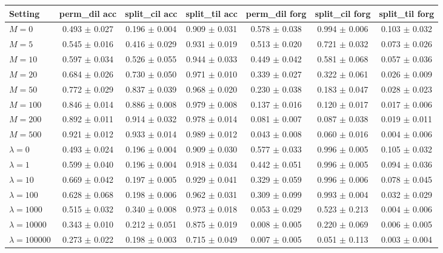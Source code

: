 \begin{tabular}{lcccccc}
\toprule
Setting & perm\_dil acc & split\_cil acc & split\_til acc & perm\_dil forg & split\_cil forg & split\_til forg \\
\midrule
$M=0$ & 0.493 $\pm$ 0.027 & 0.196 $\pm$ 0.004 & 0.909 $\pm$ 0.031 & 0.578 $\pm$ 0.038 & 0.994 $\pm$ 0.006 & 0.103 $\pm$ 0.032 \\
$M=5$ & 0.545 $\pm$ 0.016 & 0.416 $\pm$ 0.029 & 0.931 $\pm$ 0.019 & 0.513 $\pm$ 0.020 & 0.721 $\pm$ 0.032 & 0.073 $\pm$ 0.026 \\
$M=10$ & 0.597 $\pm$ 0.034 & 0.526 $\pm$ 0.055 & 0.944 $\pm$ 0.033 & 0.449 $\pm$ 0.042 & 0.581 $\pm$ 0.068 & 0.057 $\pm$ 0.036 \\
$M=20$ & 0.684 $\pm$ 0.026 & 0.730 $\pm$ 0.050 & 0.971 $\pm$ 0.010 & 0.339 $\pm$ 0.027 & 0.322 $\pm$ 0.061 & 0.026 $\pm$ 0.009 \\
$M=50$ & 0.772 $\pm$ 0.029 & 0.837 $\pm$ 0.039 & 0.968 $\pm$ 0.020 & 0.230 $\pm$ 0.038 & 0.183 $\pm$ 0.047 & 0.028 $\pm$ 0.023 \\
$M=100$ & 0.846 $\pm$ 0.014 & 0.886 $\pm$ 0.008 & 0.979 $\pm$ 0.008 & 0.137 $\pm$ 0.016 & 0.120 $\pm$ 0.017 & 0.017 $\pm$ 0.006 \\
$M=200$ & 0.892 $\pm$ 0.011 & 0.914 $\pm$ 0.032 & 0.978 $\pm$ 0.014 & 0.081 $\pm$ 0.007 & 0.087 $\pm$ 0.038 & 0.019 $\pm$ 0.011 \\
$M=500$ & 0.921 $\pm$ 0.012 & 0.933 $\pm$ 0.014 & 0.989 $\pm$ 0.012 & 0.043 $\pm$ 0.008 & 0.060 $\pm$ 0.016 & 0.004 $\pm$ 0.006 \\
\midrule
$\lambda=0$ & 0.493 $\pm$ 0.024 & 0.196 $\pm$ 0.004 & 0.909 $\pm$ 0.030 & 0.577 $\pm$ 0.033 & 0.996 $\pm$ 0.005 & 0.105 $\pm$ 0.032 \\
$\lambda=1$ & 0.599 $\pm$ 0.040 & 0.196 $\pm$ 0.004 & 0.918 $\pm$ 0.034 & 0.442 $\pm$ 0.051 & 0.996 $\pm$ 0.005 & 0.094 $\pm$ 0.036 \\
$\lambda=10$ & 0.669 $\pm$ 0.042 & 0.197 $\pm$ 0.005 & 0.929 $\pm$ 0.041 & 0.329 $\pm$ 0.059 & 0.996 $\pm$ 0.006 & 0.078 $\pm$ 0.045 \\
$\lambda=100$ & 0.628 $\pm$ 0.068 & 0.198 $\pm$ 0.006 & 0.962 $\pm$ 0.031 & 0.309 $\pm$ 0.099 & 0.993 $\pm$ 0.004 & 0.032 $\pm$ 0.029 \\
$\lambda=1000$ & 0.515 $\pm$ 0.032 & 0.340 $\pm$ 0.008 & 0.973 $\pm$ 0.018 & 0.053 $\pm$ 0.029 & 0.523 $\pm$ 0.213 & 0.004 $\pm$ 0.006 \\
$\lambda=10000$ & 0.343 $\pm$ 0.010 & 0.212 $\pm$ 0.051 & 0.875 $\pm$ 0.019 & 0.008 $\pm$ 0.005 & 0.220 $\pm$ 0.069 & 0.006 $\pm$ 0.005 \\
$\lambda=100000$ & 0.273 $\pm$ 0.022 & 0.198 $\pm$ 0.003 & 0.715 $\pm$ 0.049 & 0.007 $\pm$ 0.005 & 0.051 $\pm$ 0.113 & 0.003 $\pm$ 0.004 \\
\bottomrule
\end{tabular}
